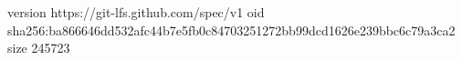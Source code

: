 version https://git-lfs.github.com/spec/v1
oid sha256:ba866646dd532afc44b7e5fb0c84703251272bb99dcd1626e239bbc6c79a3ca2
size 245723
